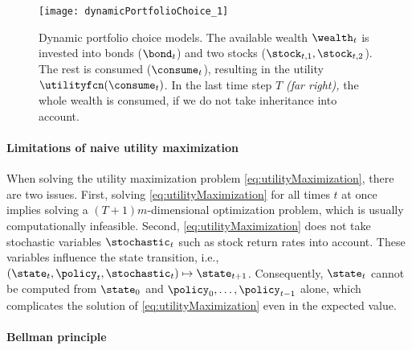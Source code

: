 \begin{SCfigure}
  \texttt{[image: dynamicPortfolioChoice\_1]}%
  \caption[Dynamic portfolio choice models]{%
    Dynamic portfolio choice models.
    The available wealth $\wealth_t$ is invested
    into bonds ($\bond_t$) and two stocks ($\stock_{t,1}, \stock_{t,2}$).
    The rest is consumed ($\consume_t$), resulting in the utility
    $\utilityfcn(\consume_t)$.
    In the last time step $T$ \emph{(far right),}
    the whole wealth is consumed, if we do not take inheritance
    into account.%
  }%
  \label{fig:dynamicPortfolioChoice}%
\end{SCfigure}

\paragraph{Limitations of naive utility maximization}

When solving the utility maximization problem \eqref{eq:utilityMaximization},
there are two issues.
First, solving \eqref{eq:utilityMaximization} for all times $t$ at once
implies solving a $(T+1) m$-dimensional optimization problem,
which is usually computationally infeasible.
Second, \eqref{eq:utilityMaximization} does not take stochastic variables
$\stochastic_t$ such as stock return rates into account.
These variables influence the state transition, i.e.,
$(\state_t, \policy_t, \stochastic_t) \mapsto \state_{t+1}$.
Consequently, $\state_t$ cannot be computed from $\state_0$ and
$\policy_0, \dotsc, \policy_{t-1}$ alone,
which complicates the solution of \eqref{eq:utilityMaximization}
even in the expected value.

\paragraph{Bellman principle}

